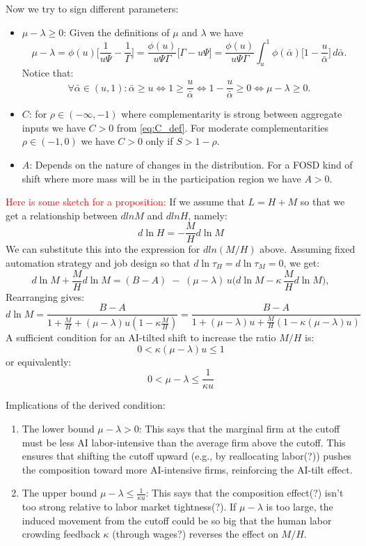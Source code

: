 \documentclass[english]{article}
\begin{document}
Now we try to sign different parameters:
\begin{itemize}
    \item $ \mu - \lambda \geq 0$: Given the definitions of $\mu$ and $\lambda$ we have
    \[
    \mu - \lambda 
    = 
    \phi(u) \Big[ \frac{1}{u \Psi} - \frac{1}{\Gamma} \Big] 
    = 
    \frac{\phi(u)}{u \Psi \Gamma} \Big[\Gamma - u\Psi \Big]
    =
    \frac{\phi(u)}{u \Psi \Gamma}
    \int_{u}^{1}\phi(\bar{\alpha}) \Big[ 1 - \frac{u}{\bar{\alpha}} \Big]\,d\bar{\alpha}.
    \]
    Notice that:
    \[
    \forall \bar{\alpha} \in (u, 1): 
    \bar{\alpha} \geq u
    \Longleftrightarrow
    1 \geq \frac{u}{\bar{\alpha}}
    \Longleftrightarrow
    1 - \frac{u}{\bar{\alpha}} \geq 0
    \Longleftrightarrow
    \mu - \lambda \geq 0.
    \]
    \item $C$: for $\rho \in (-\infty, -1)$ where complementarity is strong between aggregate inputs we have $C>0$ from \eqref{eq:C_def}. For moderate complementarities $\rho \in (-1, 0)$ we have $C>0$ only if $S > 1-\rho$.
    \item $A$: Depends on the nature of changes in the distribution. For a FOSD kind of shift where more mass will be in the participation region we have $A>0$.
    
\end{itemize}



\newpage



\textcolor{red}{Here is some sketch for a proposition:}
If we assume that $L = H + M$ so that we get a relationship between $dlnM$ and $dlnH$, namely:
\[
d\ln H = - \frac{M}{H} d\ln M
\]
We can substitute this into the expression for $dln(M/H)$ above. 
Assuming fixed automation strategy and job design so that $d\ln\tau_H =d\ln\tau_M=0$, we get:
\[
d\ln M + \frac{M}{H} d\ln M
=
(B-A)
\;-\;
(\mu-\lambda)\,u\Big(d\ln M-\kappa\,\frac{M}{H} d\ln M\Big),
\]
Rearranging gives:
\[
d\ln M 
= 
\frac{B - A}{1+\frac{M}{H}+(\mu-\lambda)u(1 - \kappa \frac{M}{H})}
=
\frac{B - A}{1+(\mu-\lambda)u + \frac{M}{H}(1 - \kappa (\mu-\lambda)u)}
\]
A sufficient condition for an AI-tilted shift to increase the ratio $M/H$ is:
\[
0 < \kappa (\mu-\lambda)u \leq 1
\]
or equivalently:
\[
\boxed{
0 < \mu-\lambda \leq \frac{1}{\kappa u}
}
\]

Implications of the derived condition:
\begin{enumerate}
    \item The lower bound $\mu - \lambda > 0$: This says that the marginal firm at the cutoff must be less AI labor-intensive than the average firm above the cutoff. This ensures that shifting the cutoff upward (e.g., by reallocating labor(?)) pushes the composition toward more AI-intensive firms, reinforcing the AI-tilt effect.
    \item The upper bound $\mu - \lambda \leq \frac{1}{\kappa u}$: This says that the composition effect(?) isn't too strong relative to labor market tightness(?). If $\mu - \lambda$ is too large, the induced movement from the cutoff could be so big that the human labor crowding feedback $\kappa$ (through wages?) reverses the effect on $M/H$.
\end{enumerate}
\end{document}
